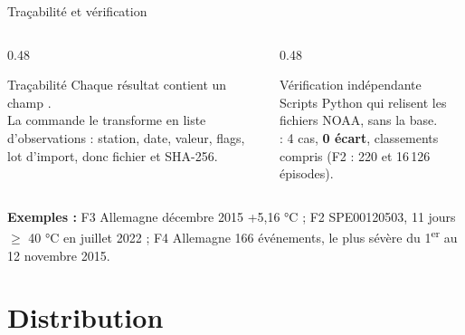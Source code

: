 \documentclass[aspectratio=169]{pres}
\begin{document}
\begin{frame}{Traçabilité et vérification}
  \begin{columns}[T]
    \begin{column}{0.48\textwidth}
      \begin{block}{Traçabilité}
        \small
        Chaque résultat contient un champ .\\
        La commande  le transforme en liste d'observations : station, date, valeur, flags, lot d'import, donc fichier et SHA-256.
      \end{block}
    \end{column}
    \begin{column}{0.48\textwidth}
      \begin{block}{Vérification indépendante}
        \small
        Scripts Python qui relisent les fichiers NOAA, sans la base.\\
         : 4 cas, \textbf{0 écart}, classements compris (F2 : 220 et 16\,126 épisodes).
      \end{block}
    \end{column}
  \end{columns}
  \vspace{0.5em}
  \small
  \textbf{Exemples :} F3 Allemagne décembre 2015 +5,16 °C ; F2 SPE00120503, 11 jours $\geq$ 40 °C en juillet 2022 ; F4 Allemagne 166 événements, le plus sévère du 1\textsuperscript{er} au 12 novembre 2015.
\end{frame}

\section{Distribution}
\end{document}
